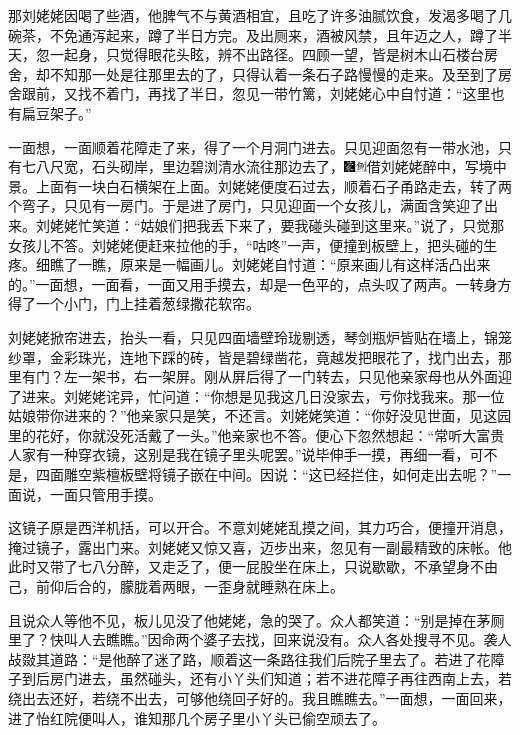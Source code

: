 那刘姥姥因喝了些酒，他脾气不与黄酒相宜，且吃了许多油腻饮食，发渴多喝了几碗茶，不免通泻起来，蹲了半日方完。及出厕来，酒被风禁，且年迈之人，蹲了半天，忽一起身，只觉得眼花头眩，辨不出路径。四顾一望，皆是树木山石楼台房舍，却不知那一处是往那里去的了，只得认着一条石子路慢慢的走来。及至到了房舍跟前，又找不着门，再找了半日，忽见一带竹篱，刘姥姥心中自忖道：``这里也有扁豆架子。''

一面想，一面顺着花障走了来，得了一个月洞门进去。只见迎面忽有一带水池，只有七八尺宽，石头砌岸，里边碧浏清水流往那边去了，{\includegraphics[width=3mm]{../Images/00006}\includegraphics[width=3mm]{../Images/00011}\footnotesize \kaishu 借刘姥姥醉中，写境中景。}上面有一块白石横架在上面。刘姥姥便度石过去，顺着石子甬路走去，转了两个弯子，只见有一房门。于是进了房门，只见迎面一个女孩儿，满面含笑迎了出来。刘姥姥忙笑道：``姑娘们把我丢下来了，要我碰头碰到这里来。''说了，只觉那女孩儿不答。刘姥姥便赶来拉他的手，``咕咚''一声，便撞到板壁上，把头碰的生疼。细瞧了一瞧，原来是一幅画儿。刘姥姥自忖道：``原来画儿有这样活凸出来的。''一面想，一面看，一面又用手摸去，却是一色平的，点头叹了两声。一转身方得了一个小门，门上挂着葱绿撒花软帘。

刘姥姥掀帘进去，抬头一看，只见四面墙壁玲珑剔透，琴剑瓶炉皆贴在墙上，锦笼纱罩，金彩珠光，连地下踩的砖，皆是碧绿凿花，竟越发把眼花了，找门出去，那里有门？左一架书，右一架屏。刚从屏后得了一门转去，只见他亲家母也从外面迎了进来。刘姥姥诧异，忙问道：``你想是见我这几日没家去，亏你找我来。那一位姑娘带你进来的？''他亲家只是笑，不还言。刘姥姥笑道：``你好没见世面，见这园里的花好，你就没死活戴了一头。''他亲家也不答。便心下忽然想起：``常听大富贵人家有一种穿衣镜，这别是我在镜子里头呢罢。''说毕伸手一摸，再细一看，可不是，四面雕空紫檀板壁将镜子嵌在中间。因说：``这已经拦住，如何走出去呢？''一面说，一面只管用手摸。

这镜子原是西洋机括，可以开合。不意刘姥姥乱摸之间，其力巧合，便撞开消息，掩过镜子，露出门来。刘姥姥又惊又喜，迈步出来，忽见有一副最精致的床帐。他此时又带了七八分醉，又走乏了，便一屁股坐在床上，只说歇歇，不承望身不由己，前仰后合的，朦胧着两眼，一歪身就睡熟在床上。

且说众人等他不见，板儿见没了他姥姥，急的哭了。众人都笑道：``别是掉在茅厕里了？快叫人去瞧瞧。''因命两个婆子去找，回来说没有。众人各处搜寻不见。袭人敁敠其道路：``是他醉了迷了路，顺着这一条路往我们后院子里去了。若进了花障子到后房门进去，虽然碰头，还有小丫头们知道；若不进花障子再往西南上去，若绕出去还好，若绕不出去，可够他绕回子好的。我且瞧瞧去。''一面想，一面回来，进了怡红院便叫人，谁知那几个房子里小丫头已偷空顽去了。

